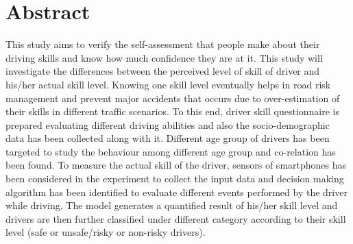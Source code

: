 \documentclass[12pt,letterpaper]{report}
\begin{document}
\chapter*{Abstract}
    \thispagestyle{empty}
    This study aims to verify the self-assessment that people make about their driving skills and know how much confidence they are at it. This study will investigate the differences between the perceived level of skill of driver and his/her actual skill level. Knowing one skill level eventually helps in road risk management and prevent major accidents that occurs due to over-estimation of their skills in different traffic scenarios. To this end, driver skill questionnaire is prepared evaluating different driving abilities and also the socio-demographic data has been collected along with it. Different age group of drivers has been targeted to study the behaviour among different age group and co-relation has been found. To measure the actual skill of the driver, sensors of smartphones has been considered in the experiment to collect the input data and decision making algorithm has been identified to evaluate different events performed by the driver while driving. The model generates a quantified result of his/her skill level and drivers are then further classified under different category according to their skill level (safe or unsafe/risky or non-risky drivers).
\tableofcontents
\listoffigures
\listoftables
\clearpage
{}

















\newpage
\end{document}
